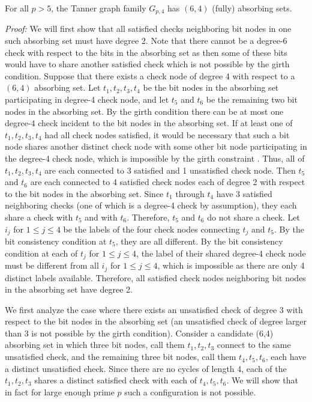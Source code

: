 \begin{lemma}\label{Lem5} For all $p > 5$, the Tanner graph family $G_{p,4}$ has $(6,4)$ (fully) absorbing
sets.
\end{lemma}

\noindent \textit{Proof:} We will first show that all satisfied
checks neighboring bit nodes in one such absorbing set must have
degree 2. Note that there cannot be a degree-6 check with respect to
the bits in the absorbing set as then some of these bits would have
to share another satisfied check which is not possible by the girth
condition. Suppose that there exists a check node of degree 4 with
respect to a $(6,4)$ absorbing set. Let $t_1, t_2,t_3,t_4$ be the
bit nodes in the absorbing set participating in degree-4 check node,
and let $t_5$ and $t_6$ be the remaining two bit nodes in the
absorbing set. By the girth condition there can be at most one
degree-4 check incident to the bit nodes in the absorbing set. If at
least one of $t_1, t_2,t_3,t_4$ had all check nodes satisfied, it
would be necessary that such a bit node shares another distinct
check node with some other bit node participating in the degree-4
check node, which is impossible by the girth constraint \cite{fan}.
Thus, all of $t_1, t_2,t_3,t_4$ are each connected to 3 satisfied
and 1 unsatisfied check node. Then $t_5$ and $t_6$ are each
connected to 4 satisfied check nodes each of degree 2 with respect
to the bit nodes in the absorbing set. Since $t_1$ through $t_4$
have 3 satisfied neighboring checks (one of which is a degree-4
check by assumption), they each share a check with $t_5$ and with
$t_6$. Therefore, $t_5$ and $t_6$ do not share a check. Let $i_j$
for $1 \leq j \leq 4$ be the labels of the four check nodes
connecting $t_j$ and $t_5$. By the bit consistency condition at
$t_5$, they are all different. By the bit consistency condition at
each of $t_j$ for $1 \leq j \leq 4$, the label of their shared
degree-4 check node must be different from all $i_j$ for $1 \leq j
\leq 4$, which is impossible as there are only 4 distinct labels
available. Therefore, all satisfied check nodes neighboring bit
nodes in the absorbing set have degree 2.

We first analyze the case where there exists an unsatisfied check of
degree 3 with respect to the bit nodes in the absorbing set (an
unsatisfied check of degree larger than 3 is not possible by the
girth condition). Consider a candidate (6,4) absorbing set in which
three bit nodes, call them $t_1,t_2,t_3$ connect to the same
unsatisfied check, and the remaining three bit nodes, call them
$t_4,t_5,t_6$, each have a distinct unsatisfied check. Since there
are no cycles of length 4, each of the $t_1,t_2,t_3$ shares a
distinct satisfied check with each of $t_4,t_5,t_6$. We will show
that in fact for large enough prime $p$ such a configuration is not
possible.

